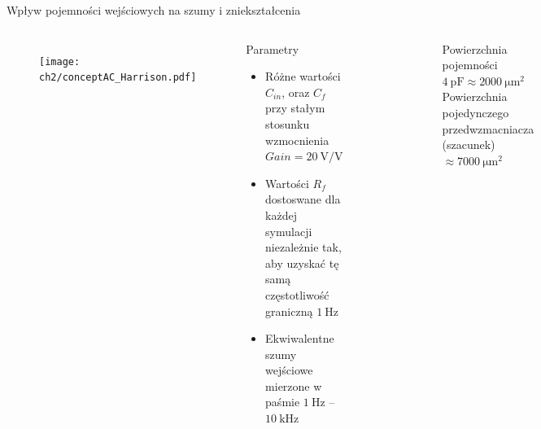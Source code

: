 \begin{frame}{Wpływ pojemności wejściowych na szumy i zniekształcenia}
    \begin{columns}
        \vspace{-1em}

        \begin{figure}[H]
            \centering
            \texttt{[image: ch2/conceptAC\_Harrison.pdf]} 
        \end{figure}
\vspace{-2em}

        \begin{block}{Parametry}
            \begin{itemize}
                \item Różne wartości $C_{in}$, oraz $C_{f}$ przy stałym stosunku wzmocnienia $Gain = \SI{20}{\volt\per\volt}$
                \item Wartości $R_{f}$ dostoswane dla każdej symulacji niezależnie tak, aby uzyskać tę samą częstotliwość graniczną $\SI{1}{\hertz}$
                \item Ekwiwalentne szumy wejściowe mierzone w paśmie $\SI{1}{\hertz}$ -- $\SI{10}{\kilo\hertz}$
            \end{itemize}
                \end{block}

\vspace{-1em}
    \begin{figure}[H]
        \centering
        \includegraphics[scale=0.8]{Figures/thd_C_in.pdf} 
    \end{figure}
    \vspace{-2em}

    {\renewcommand\normalsize{\small}%
    \normalsize
    Powierzchnia pojemności $\SI{4}{\pico\farad} \approx\SI{2000}{\micro\metre\squared}$ 
    Powierzchnia pojedynczego przedwzmacniacza (szacunek)  $\approx\SI{7000}{\micro\metre\squared}$ }
\end{columns}

\end{frame}
